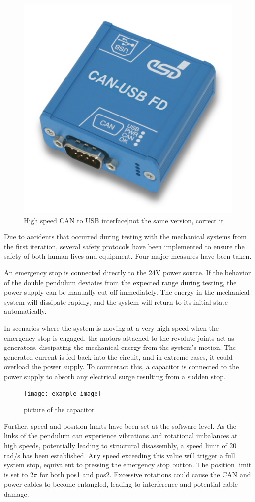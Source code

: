 \begin{figure}[H]
    \centering
    \includegraphics[width=0.3\linewidth]{figures/hardware_setup/can_blue_box.png}
    \caption{High speed CAN to USB interface[not the same version, correct it]}
    \label{fig:my_label}
\end{figure}

Due to accidents that occurred during testing with the mechanical systems from the first iteration, several safety protocols have been implemented to ensure the safety of both human lives and equipment. Four major measures have been taken.

An emergency stop is connected directly to the 24V power source. If the behavior of the double pendulum deviates from the expected range during testing, the power supply can be manually cut off immediately. The energy in the mechanical system will dissipate rapidly, and the system will return to its initial state automatically.

In scenarios where the system is moving at a very high speed when the emergency stop is engaged, the motors attached to the revolute joints act as generators, dissipating the mechanical energy from the system's motion. The generated current is fed back into the circuit, and in extreme cases, it could overload the power supply. To counteract this, a capacitor is connected to the power supply to absorb any electrical surge resulting from a sudden stop.

\begin{figure}[htbp]
    \centering
    \texttt{[image: example-image]}
    \caption{picture of the capacitor}
    \label{fig:example_figure}
\end{figure}

Further, speed and position limits have been set at the software level. As the links of the pendulum can experience vibrations and rotational imbalances at high speeds, potentially leading to structural disassembly, a speed limit of 20 rad/s has been established. Any speed exceeding this value will trigger a full system stop, equivalent to pressing the emergency stop button. The position limit is set to \(2\pi\) for both pos1 and pos2. Excessive rotations could cause the CAN and power cables to become entangled, leading to interference and potential cable damage.

